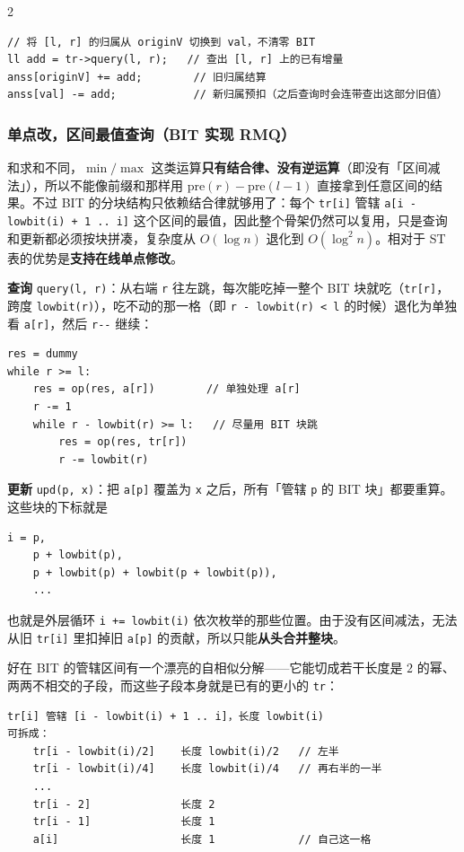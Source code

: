 \begin{multicols*}{2}
	\begin{verbatim}
// 将 [l, r] 的归属从 originV 切换到 val，不清零 BIT
ll add = tr->query(l, r);   // 查出 [l, r] 上的已有增量
anss[originV] += add;        // 旧归属结算
anss[val] -= add;            // 新归属预扣（之后查询时会连带查出这部分旧值）
	\end{verbatim}

	\subsubsection{单点改，区间最值查询（BIT 实现 RMQ）}

	和求和不同，$\min / \max$ 这类运算\textbf{只有结合律、没有逆运算}（即没有「区间减法」），所以不能像前缀和那样用 $\text{pre}(r) - \text{pre}(l-1)$ 直接拿到任意区间的结果。不过 BIT 的分块结构只依赖结合律就够用了：每个 \verb|tr[i]| 管辖 \verb|a[i - lowbit(i) + 1 .. i]| 这个区间的最值，因此整个骨架仍然可以复用，只是查询和更新都必须按块拼凑，复杂度从 $O(\log n)$ 退化到 $O(\log^2 n)$。相对于 ST 表的优势是\textbf{支持在线单点修改}。

	\textbf{查询} \verb|query(l, r)|：从右端 \verb|r| 往左跳，每次能吃掉一整个 BIT 块就吃（\verb|tr[r]|，跨度 \verb|lowbit(r)|），吃不动的那一格（即 \verb|r - lowbit(r) < l| 的时候）退化为单独看 \verb|a[r]|，然后 \verb|r--| 继续：

	\begin{verbatim}
res = dummy
while r >= l:
    res = op(res, a[r])        // 单独处理 a[r]
    r -= 1
    while r - lowbit(r) >= l:   // 尽量用 BIT 块跳
        res = op(res, tr[r])
        r -= lowbit(r)
	\end{verbatim}

	\textbf{更新} \verb|upd(p, x)|：把 \verb|a[p]| 覆盖为 \verb|x| 之后，所有「管辖 \verb|p| 的 BIT 块」都要重算。这些块的下标就是

	\begin{verbatim}
i = p,
    p + lowbit(p),
    p + lowbit(p) + lowbit(p + lowbit(p)),
    ...
	\end{verbatim}

	也就是外层循环 \verb|i += lowbit(i)| 依次枚举的那些位置。由于没有区间减法，无法从旧 \verb|tr[i]| 里扣掉旧 \verb|a[p]| 的贡献，所以只能\textbf{从头合并整块}。

	好在 BIT 的管辖区间有一个漂亮的自相似分解——它能切成若干长度是 $2$ 的幂、两两不相交的子段，而这些子段本身就是已有的更小的 \verb|tr|：

	\begin{verbatim}
tr[i] 管辖 [i - lowbit(i) + 1 .. i]，长度 lowbit(i)
可拆成：
    tr[i - lowbit(i)/2]    长度 lowbit(i)/2   // 左半
    tr[i - lowbit(i)/4]    长度 lowbit(i)/4   // 再右半的一半
    ...
    tr[i - 2]              长度 2
    tr[i - 1]              长度 1
    a[i]                   长度 1             // 自己这一格


\end{verbatim}
\end{multicols*}
